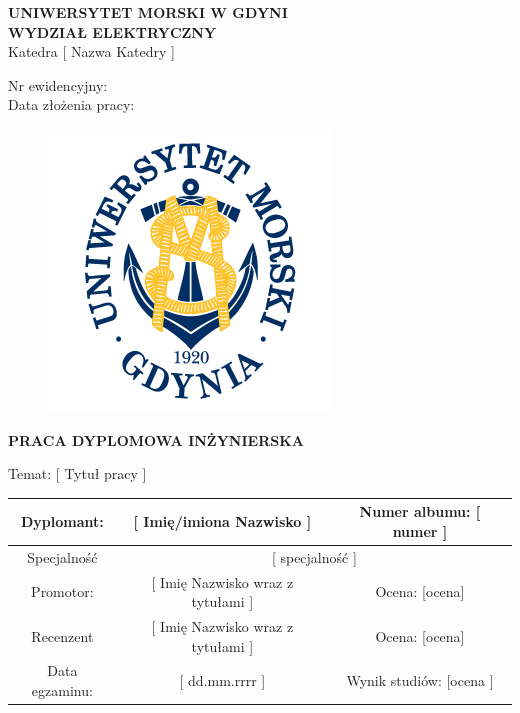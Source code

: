 \documentclass[a4paper,12pt,twoside]{book}
\begin{document}
    \thispagestyle{empty}
    \noindent
    \begin{minipage}{.6\linewidth}
        \begin{flushleft}
            \textbf{UNIWERSYTET MORSKI W GDYNI} \\ 
            \textbf{WYDZIAŁ ELEKTRYCZNY} \\
            Katedra [ Nazwa Katedry ]
        \end{flushleft}
    \end{minipage}
    \begin{minipage}{.4\linewidth}
        \begin{flushright}
        Nr ewidencyjny:\dotfill \\
        Data złożenia pracy:\dotfill \\
        \hfill
        \end{flushright}
    \end{minipage}
    
    \begin{figure}[htbp]
        \centerline{\includegraphics[scale=0.5]{umg-zolty.png}}
    \end{figure}
    \centerline{\large \textbf{ PRACA DYPLOMOWA INŻYNIERSKA}}
    \vspace{1cm}
    
    \noindent 
    Temat: [ Tytuł pracy ] 
    \vspace{1.5cm}

    \begin{center}
        \begin{tabular}{|c|c|c|}
            \hline
            Dyplomant: & [ Imię/imiona Nazwisko ] & Numer albumu: [ numer ] \\
            \hline
            Specjalność & \multicolumn{2}{|c|}{[ specjalność ]}\\
            \hline
            Promotor: & [ Imię Nazwisko wraz z tytułami ] & Ocena: [ocena]\\
            \hline
            Recenzent & [ Imię Nazwisko wraz z tytułami ] & Ocena: [ocena] \\
            \hline
            Data egzaminu: & [ dd.mm.rrrr ] & Wynik studiów: [ocena ] \\
            \hline
        \end{tabular}
    \end{center}
    
\end{document}
